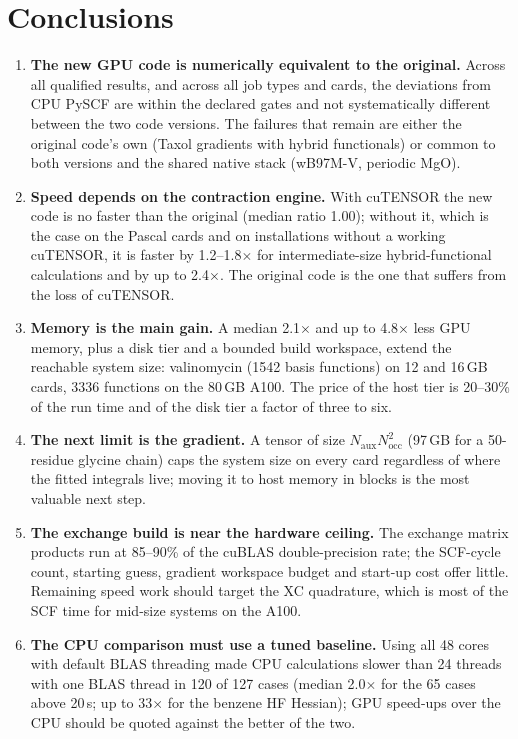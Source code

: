 \section{Conclusions}
\label{sec:conclusions}

\begin{enumerate}[itemsep=2pt]
\item \textbf{The new GPU code is numerically equivalent to the original.} Across all qualified results, and across all job types and cards, the deviations from CPU PySCF are within the declared gates and not systematically different between the two code versions. The failures that remain are either the original code's own (Taxol gradients with hybrid functionals) or common to both versions and the shared native stack (wB97M-V, periodic MgO).
\item \textbf{Speed depends on the contraction engine.} With cuTENSOR the new code is no faster than the original (median ratio 1.00); without it, which is the case on the Pascal cards and on installations without a working cuTENSOR, it is faster by 1.2--1.8$\times$ for intermediate-size hybrid-functional calculations and by up to 2.4$\times$. The original code is the one that suffers from the loss of cuTENSOR.
\item \textbf{Memory is the main gain.} A median 2.1$\times$ and up to 4.8$\times$ less GPU memory, plus a disk tier and a bounded build workspace, extend the reachable system size: valinomycin (1542 basis functions) on 12 and 16\,GB cards, 3336 functions on the 80\,GB A100. The price of the host tier is 20--30\% of the run time and of the disk tier a factor of three to six.
\item \textbf{The next limit is the gradient.} A tensor of size $N_\mathrm{aux}N_\mathrm{occ}^2$ (97\,GB for a 50-residue glycine chain) caps the system size on every card regardless of where the fitted integrals live; moving it to host memory in blocks is the most valuable next step.
\item \textbf{The exchange build is near the hardware ceiling.} The exchange matrix products run at 85--90\% of the cuBLAS double-precision rate; the SCF-cycle count, starting guess, gradient workspace budget and start-up cost offer little. Remaining speed work should target the XC quadrature, which is most of the SCF time for mid-size systems on the A100.
\item \textbf{The CPU comparison must use a tuned baseline.} Using all 48 cores with default BLAS threading made CPU calculations slower than 24 threads with one BLAS thread in 120 of 127 cases (median 2.0$\times$ for the 65 cases above 20\,s; up to 33$\times$ for the benzene HF Hessian); GPU speed-ups over the CPU should be quoted against the better of the two.
\end{enumerate}
